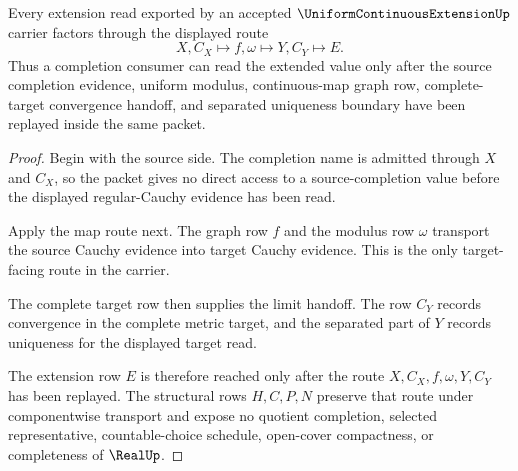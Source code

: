 \begin{theorem}
\label{thm:uniform-continuous-extension-completion-handoff}
Every extension read exported by an accepted $\UniformContinuousExtensionUp$ carrier factors through the displayed route
$$
X,C_X\longmapsto f,\omega\longmapsto Y,C_Y\longmapsto E .
$$
Thus a completion consumer can read the extended value only after the source completion evidence, uniform modulus, continuous-map graph row, complete-target convergence handoff, and separated uniqueness boundary have been replayed inside the same packet.
\end{theorem}
\begin{proof}
Begin with the source side. The completion name is admitted through $X$ and $C_X$, so the packet gives no direct access to a source-completion value before the displayed regular-Cauchy evidence has been read.

Apply the map route next. The graph row $f$ and the modulus row $\omega$ transport the source Cauchy evidence into target Cauchy evidence. This is the only target-facing route in the carrier.

The complete target row then supplies the limit handoff. The row $C_Y$ records convergence in the complete metric target, and the separated part of $Y$ records uniqueness for the displayed target read.

The extension row $E$ is therefore reached only after the route $X,C_X,f,\omega,Y,C_Y$ has been replayed. The structural rows $H,C,P,N$ preserve that route under componentwise transport and expose no quotient completion, selected representative, countable-choice schedule, open-cover compactness, or completeness of $\RealUp$.
\end{proof}

\begin{closurestatus}{\UniformContinuousExtensionUp}
  \theoryclosure{\seedClosure}
  \formalstatus{\unformalizedV}
\end{closurestatus}
